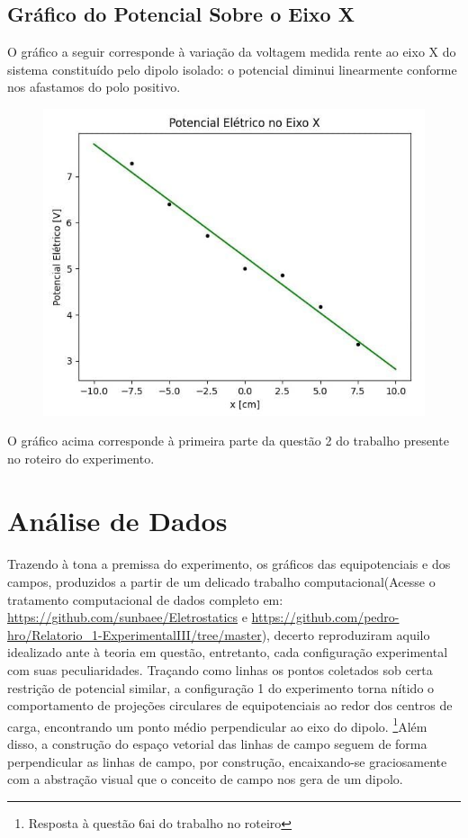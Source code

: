 \documentclass[column,brazilian,12pt,a4paper,final]{article}
\begin{document}
\justifying
\subsection{Gráfico do Potencial Sobre o Eixo X}
O gráfico a seguir corresponde à variação da voltagem medida rente ao eixo X do sistema constituído pelo dipolo isolado: o potencial diminui linearmente conforme nos afastamos do polo positivo. 
\begin{figure}[H]
    \centering
    \includegraphics[width=0.5\linewidth]{DPx.jpg}
\end{figure}
O gráfico acima corresponde à primeira parte da questão 2 do trabalho presente no roteiro do experimento.  


\justifying
\section{Análise de Dados}
\paragraph{}
Trazendo à tona a premissa do experimento, os gráficos das equipotenciais e dos campos, produzidos a partir de um delicado trabalho computacional(Acesse o tratamento computacional de dados completo em: \url{https://github.com/sunbaee/Eletrostatics} e \url{https://github.com/pedro-hro/Relatorio_1-ExperimentalIII/tree/master}), decerto reproduziram aquilo idealizado ante à teoria em questão, entretanto, cada configuração experimental com suas peculiaridades. Traçando como linhas os pontos coletados sob certa restrição de potencial similar, a configuração 1 do experimento torna nítido o comportamento de projeções circulares de equipotenciais ao redor dos centros de carga, encontrando um ponto médio perpendicular ao eixo do dipolo. \footnote{Resposta à questão 6ai do trabalho no roteiro}Além disso, a construção do espaço vetorial das linhas de campo seguem de forma perpendicular as linhas de campo, por construção, encaixando-se graciosamente com a abstração visual que o conceito de campo nos gera de um dipolo.
\end{document}
